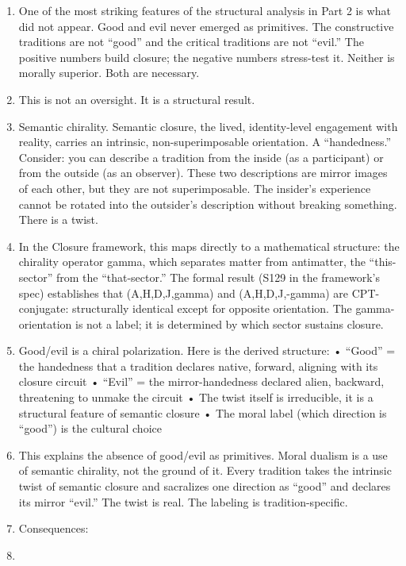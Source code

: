 \documentclass[
]{article}
\begin{document}
\begin{enumerate}
\def\labelenumi{\arabic{enumi}.}
\setcounter{enumi}{182}
\item
  One of the most striking features of the structural analysis in Part 2
  is what did not appear. Good and evil never emerged as primitives. The
  constructive traditions are not ``good'' and the critical traditions
  are not ``evil.'' The positive numbers build closure; the negative
  numbers stress-test it. Neither is morally superior. Both are
  necessary.
\item
  This is not an oversight. It is a structural result.
\item
  Semantic chirality. Semantic closure, the lived, identity-level
  engagement with reality, carries an intrinsic, non-superimposable
  orientation. A ``handedness.'' Consider: you can describe a tradition
  from the inside (as a participant) or from the outside (as an
  observer). These two descriptions are mirror images of each other, but
  they are not superimposable. The insider's experience cannot be
  rotated into the outsider's description without breaking something.
  There is a twist.
\item
  In the Closure framework, this maps directly to a mathematical
  structure: the chirality operator gamma, which separates matter from
  antimatter, the ``this-sector'' from the ``that-sector.'' The formal
  result (S129 in the framework's spec) establishes that (A,H,D,J,gamma)
  and (A,H,D,J,-gamma) are CPT-conjugate: structurally identical except
  for opposite orientation. The gamma-orientation is not a label; it is
  determined by which sector sustains closure.
\item
  Good/evil is a chiral polarization. Here is the derived structure: •
  ``Good'' = the handedness that a tradition declares native, forward,
  aligning with its closure circuit • ``Evil'' = the mirror-handedness
  declared alien, backward, threatening to unmake the circuit • The
  twist itself is irreducible, it is a structural feature of semantic
  closure • The moral label (which direction is ``good'') is the
  cultural choice
\item
  This explains the absence of good/evil as primitives. Moral dualism is
  a use of semantic chirality, not the ground of it. Every tradition
  takes the intrinsic twist of semantic closure and sacralizes one
  direction as ``good'' and declares its mirror ``evil.'' The twist is
  real. The labeling is tradition-specific.
\item
  Consequences:
\item

\end{enumerate}
\end{document}
